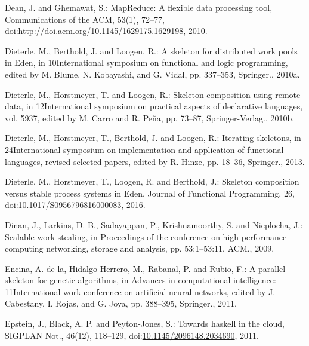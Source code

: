 \documentclass[paper=A4,twoside=true,openright,parskip=full,chapterprefix=true,headings=normal,bibliography=totoc,listof=totoc,titlepage=on,captions=tableabove,draft=false,british]{scrreprt}%
\begin{document}
\leavevmode\hypertarget{ref-Dean:2010:MFD:1629175.1629198}{}%
Dean, J. and Ghemawat, S.: MapReduce: A flexible data processing tool,
Communications of the ACM, 53(1), 72--77,
doi:\href{https://doi.org/http://doi.acm.org/10.1145/1629175.1629198}{http://doi.acm.org/10.1145/1629175.1629198},
2010.

\leavevmode\hypertarget{ref-dieterle2010skeleton}{}%
Dieterle, M., Berthold, J. and Loogen, R.: A skeleton for distributed
work pools in Eden, in 10International symposium on functional and logic
programming, edited by M. Blume, N. Kobayashi, and G. Vidal, pp.
337--353, Springer., 2010a.

\leavevmode\hypertarget{ref-Dieterle2010}{}%
Dieterle, M., Horstmeyer, T. and Loogen, R.: Skeleton composition using
remote data, in 12International symposium on practical aspects of
declarative languages, vol. 5937, edited by M. Carro and R. Peña, pp.
73--87, Springer-Verlag., 2010b.

\leavevmode\hypertarget{ref-Dieterle2013}{}%
Dieterle, M., Horstmeyer, T., Berthold, J. and Loogen, R.: Iterating
skeletons, in 24International symposium on implementation and
application of functional languages, revised selected papers, edited by
R. Hinze, pp. 18--36, Springer., 2013.

\leavevmode\hypertarget{ref-dieterle_horstmeyer_loogen_berthold_2016}{}%
Dieterle, M., Horstmeyer, T., Loogen, R. and Berthold, J.: Skeleton
composition versus stable process systems in Eden, Journal of Functional
Programming, 26,
doi:\href{https://doi.org/10.1017/S0956796816000083}{10.1017/S0956796816000083},
2016.

\leavevmode\hypertarget{ref-Dinan:2009:SWS:1654059.1654113}{}%
Dinan, J., Larkins, D. B., Sadayappan, P., Krishnamoorthy, S. and
Nieplocha, J.: Scalable work stealing, in Proceedings of the conference
on high performance computing networking, storage and analysis, pp.
53:1--53:11, ACM., 2009.

\leavevmode\hypertarget{ref-delaEncina2011}{}%
Encina, A. de la, Hidalgo-Herrero, M., Rabanal, P. and Rubio, F.: A
parallel skeleton for genetic algorithms, in Advances in computational
intelligence: 11International work-conference on artificial neural
networks, edited by J. Cabestany, I. Rojas, and G. Joya, pp. 388--395,
Springer., 2011.

\leavevmode\hypertarget{ref-Epstein:2011:THC:2096148.2034690}{}%
Epstein, J., Black, A. P. and Peyton-Jones, S.: Towards haskell in the
cloud, SIGPLAN Not., 46(12), 118--129,
doi:\href{https://doi.org/10.1145/2096148.2034690}{10.1145/2096148.2034690},
2011.
\end{document}
